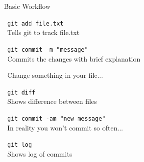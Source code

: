 \documentclass[12pt]{beamer}
\begin{document}
\begin{frame}{Basic Workflow}

\textbullet\ \texttt{git add file.txt} \\
\qquad \textbullet\ {\footnotesize Tells git to track file.txt} \\
\vspace{.4cm}

\textbullet\ \texttt{git commit -m "message"} \\
\qquad \textbullet\ {\footnotesize Commits the changes with brief explanation} \\
\vspace{.4cm}

\textbullet\ Change something in your file... \\
\vspace{.4cm}

\textbullet\ \texttt{git diff} \\
\qquad \textbullet\ {\footnotesize Shows difference between files} \\
\vspace{.4cm}

\textbullet\ \texttt{git commit -am "new message"} \\
\qquad \textbullet\ {\footnotesize In reality you won't commit so often...} \\
\vspace{.4cm}

\textbullet\ \texttt{git log} \\
\qquad \textbullet\ {\footnotesize Shows log of commits} \\
\vspace{.4cm}

\end{frame}
\end{document}

